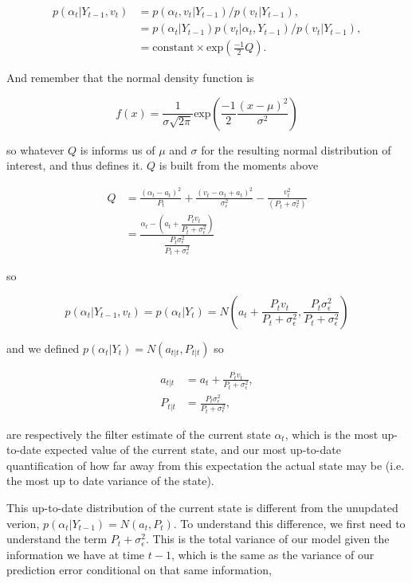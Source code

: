\documentclass{tufte-book}
\begin{document}
\begin{align*}
p(\alpha_t | Y_{t-1}, v_t) &= p(\alpha_t, v_t | Y_{t-1})/p(v_t | Y_{t-1}), \\
&= p(\alpha_t | Y_{t-1}) p(v_t | \alpha_t, Y_{t-1}) /p(v_t | Y_{t-1}), \\
&= \text{constant} \times \text{exp}\left( \frac{-1}{2} Q \right).
\end{align*}

\noindent And remember that the normal density function is

\[
f(x) = \frac{1}{\sigma \sqrt{2\pi}} \text{exp}\left( \frac{-1}{2} \frac{(x-\mu)^2}{\sigma^2} \right)
\]

\noindent so whatever $Q$ is informs us of $\mu$ and $\sigma$ for the resulting normal distribution of interest, and thus defines it. $Q$ is built from the moments above

\begin{align*}
Q &= \frac{(\alpha_t - a_t)^2}{P_t} + \frac{(v_t - \alpha_t + a_t)^2}{\sigma_\epsilon^2} - \frac{v_t^2}{(P_t + \sigma_\epsilon^2)} \\
&= \frac{\alpha_t - \left(a_t +  \dfrac{P_t v_t}{P_t + \sigma_\epsilon^2} \right)}{ \dfrac{P_t \sigma_\epsilon^2}{P_t + \sigma_\epsilon^2}}
\end{align*}

\noindent so

\[
p(\alpha_t | Y_{t-1}, v_t) = p(\alpha_t | Y_t) = N\left( a_t + \frac{P_t v_t}{P_t + \sigma_\epsilon^2}, \frac{P_t \sigma_\epsilon^2}{P_t + \sigma_\epsilon^2} \right)
\]

\noindent and we defined $p(\alpha_t | Y_t) = N(a_{t|t}, P_{t|t})$ so

\begin{align*}
a_{t|t} &= a_t + \frac{P_t v_t}{P_t + \sigma_\epsilon^2}, \\
P_{t|t} &= \frac{P_t \sigma_\epsilon^2}{P_t + \sigma_\epsilon^2},
\end{align*}

\noindent are respectively the filter estimate of the current state $\alpha_t$, which is the most up-to-date expected value of the current state, and our most up-to-date quantification of how far away from this expectation the actual state may be (i.e. the most up to date variance of the state).

This up-to-date distribution of the current state is different from the unupdated verion, $p(\alpha_t | Y_{t-1}) = N(a_t, P_t)$. To understand this difference, we first need to understand the term $P_t + \sigma_\epsilon^2$. This is the total variance of our model given the information we have at time $t-1$, which is the same as the variance of our prediction error conditional on that same information,
\end{document}
